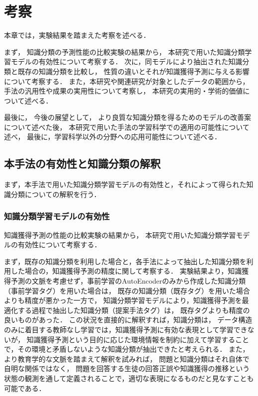 \chapter{考察}
\label{chap:discussion}
\fancyhf{}
\rhead{\thepage}
\cfoot{\thepage}

本章では，実験結果を踏まえた考察を述べる．

まず，
知識分類の予測性能の比較実験の結果から，
本研究で用いた知識分類学習モデルの有効性について考察する．
次に，同モデルにより抽出された知識分類と既存の知識分類を比較し，
性質の違いとそれが知識獲得予測に与える影響について考察する．
また，本研究や関連研究が対象としたデータの範囲から，
手法の汎用性や成果の実用性について考察し，
本研究の実用的・学術的価値について述べる．

最後に，
今後の展望として，
より良質な知識分類を得るためのモデルの改善案について述べた後，
本研究で用いた手法の学習科学での適用の可能性について述べ，
最後に，学習科学以外の分野への応用可能性について述べる．

\section{本手法の有効性と知識分類の解釈}
まず，本手法で用いた知識分類学習モデルの有効性と，それによって得られた知識分類についての解釈を行う．


\subsection{知識分類学習モデルの有効性}
知識獲得予測の性能の比較実験の結果から，
本研究で用いた知識分類学習モデルの有効性について考察する．


まず，既存の知識分類を利用した場合と，各手法によって抽出した知識分類を利用した場合の，知識獲得予測の精度に関して考察する．
実験結果より，知識獲得予測の文脈を考慮せず，事前学習のAutoEncoderのみから作成した知識分類（事前学習タグ）を用いた場合は，
既存の知識分類（既存タグ）を用いた場合よりも精度が悪かった一方で，
知識分類学習モデルにより，知識獲得予測を最適化する過程で抽出した知識分類（提案手法タグ）は，
既存タグよりも精度の良いものがあった．
この状況を直接的に解釈すれば，知識分類は，
データ構造のみに着目する教師なし学習では，知識獲得予測に有効な表現として学習できないが，
知識獲得予測という目的に応じた環境情報を制約に加えて学習することで，その環境と矛盾しないような知識分類が抽出できたと考えられる．
また，より教育学的な文脈を踏まえて解釈を試みれば，
問題と知識分類はそれ自体で自明な関係ではなく，
問題を回答する生徒の回答正誤や知識獲得の推移という状態の観測を通して定義されることで，適切な表現になるものだと見なすことも可能である．

